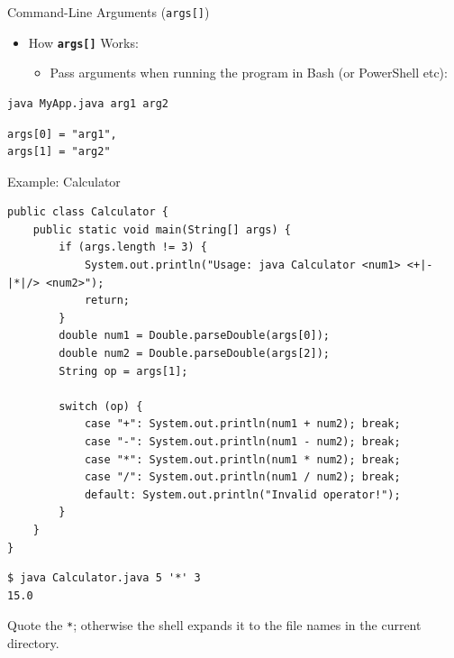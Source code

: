 \documentclass[aspectratio=43,10pt,t]{beamer}
\newcommand{\code}[1]{\texttt{#1}}
\begin{document}
\begin{frame}[fragile]{Command-Line Arguments (\texttt{args[]})}
  \begin{itemize}
    \item How \textbf{\code{args[]}} Works:
      \begin{itemize}
        \item Pass arguments when running the program in Bash (or PowerShell etc):
      \end{itemize}
  \end{itemize}
\begin{lstlisting}[language={},linewidth=0.62\linewidth,xleftmargin=0.12\linewidth]
java MyApp.java arg1 arg2
\end{lstlisting}
  \hspace*{0.12\linewidth}{\small Here}
\begin{lstlisting}[linewidth=0.62\linewidth,xleftmargin=0.12\linewidth]
args[0] = "arg1",
args[1] = "arg2"
\end{lstlisting}
\end{frame}

\begin{frame}[fragile]{Example: Calculator}
\begin{lstlisting}[basicstyle=\ttfamily\fontsize{6.3}{7.4}\selectfont]
public class Calculator {
    public static void main(String[] args) {
        if (args.length != 3) {
            System.out.println("Usage: java Calculator <num1> <+|-|*|/> <num2>");
            return;
        }
        double num1 = Double.parseDouble(args[0]);
        double num2 = Double.parseDouble(args[2]);
        String op = args[1];

        switch (op) {
            case "+": System.out.println(num1 + num2); break;
            case "-": System.out.println(num1 - num2); break;
            case "*": System.out.println(num1 * num2); break;
            case "/": System.out.println(num1 / num2); break;
            default: System.out.println("Invalid operator!");
        }
    }
}
\end{lstlisting}
  \vskip2mm
\begin{lstlisting}[language={},basicstyle=\ttfamily\scriptsize\color{green!45!black}]
$ java Calculator.java 5 '*' 3
15.0
\end{lstlisting}
  {\scriptsize\color{gray} Quote the \code{*}; otherwise the shell expands it to the file names in the current directory.}
\end{frame}
\end{document}
